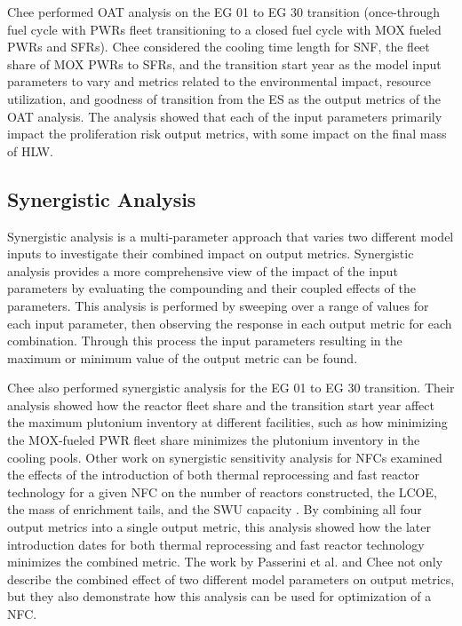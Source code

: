 Chee \cite{chee_sensitivity_2019} performed \gls{OAT} analysis on the \gls{EG} 
01 to \gls{EG} 30 transition 
(once-through fuel cycle with \glspl{PWR} fleet transitioning to a 
closed fuel cycle with \gls{MOX} fueled \glspl{PWR} and \glspl{SFR}). 
Chee considered the cooling time length 
for \gls{SNF}, the fleet share of \gls{MOX} \glspl{PWR} to \glspl{SFR}, and 
the transition start year as the model input parameters to vary and metrics 
related to the environmental impact, resource utilization, and goodness of 
transition from the \gls{ES} \cite{wigeland_nuclear_2014} as the output 
metrics of the \gls{OAT} analysis. The analysis showed 
that each of the input parameters primarily impact the proliferation risk 
output metrics, with some impact on the final mass of \gls{HLW}. 

\subsection{Synergistic Analysis}
Synergistic analysis is a multi-parameter approach that varies two different 
model inputs to investigate their combined impact on output metrics. Synergistic 
analysis provides a more comprehensive view of the impact of the input 
parameters by evaluating the compounding and their coupled effects of the 
parameters.
This analysis is performed by sweeping over a range of values for each input 
parameter, then observing the response in each output metric for each 
combination. Through this process the input parameters resulting in the 
maximum or minimum value of the output metric can be found. 

Chee \cite{chee_sensitivity_2019} also performed synergistic analysis for 
the \gls{EG} 01 to \gls{EG} 30 transition. 
Their analysis showed how the reactor fleet share and the transition start 
year affect the maximum plutonium inventory at different facilities, such as 
how minimizing the \gls{MOX}-fueled \gls{PWR} fleet share minimizes the 
plutonium inventory in the cooling pools. 
Other work on synergistic sensitivity analysis for \glspl{NFC} examined the 
effects of the introduction of both thermal reprocessing and fast reactor 
technology for a given \gls{NFC} on the number of reactors constructed, 
the \gls{LCOE}, the mass of enrichment tails, and the \gls{SWU} 
capacity \cite{passerini_systematic_2014}. By combining all four output 
metrics into a single output metric, this analysis showed how the 
later introduction dates for both thermal reprocessing 
and fast reactor technology minimizes the combined metric. The work by 
Passerini 
et al. \cite{passerini_systematic_2014} and Chee \cite{chee_sensitivity_2019}
not only describe the combined effect of two different model parameters on 
output metrics, but they also demonstrate how this analysis can be used for 
optimization of a \gls{NFC}. 

